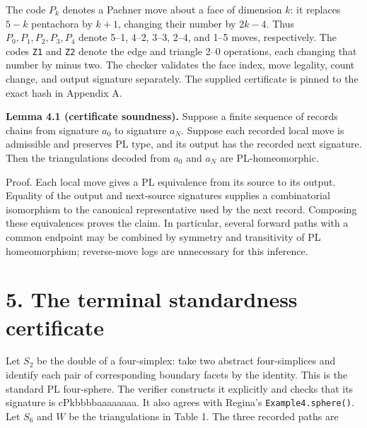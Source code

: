 \documentclass[11pt,letterpaper]{article}
\begin{document}
The code $P_k$ denotes a Pachner move about a face of dimension $k$: it replaces $5-k$ pentachora by $k+1$, changing their number by $2k-4$. Thus $P_0,P_1,P_2,P_3,P_4$ denote 5--1, 4--2, 3--3, 2--4, and 1--5 moves, respectively. The codes {\small\texttt{Z1}} and {\small\texttt{Z2}} denote the edge and triangle 2--0 operations, each changing that number by minus two. The checker validates the face index, move legality, count change, and output signature separately. The supplied certificate is pinned to the exact hash in Appendix A.

\medskip\noindent\textbf{Lemma 4.1 (certificate soundness).} Suppose a finite sequence of records chains from signature $a_0$ to signature $a_N$. Suppose each recorded local move is admissible and preserves PL type, and its output has the recorded next signature. Then the triangulations decoded from $a_0$ and $a_N$ are PL-homeomorphic.

Proof. Each local move gives a PL equivalence from its source to its output. Equality of the output and next-source signatures supplies a combinatorial isomorphism to the canonical representative used by the next record. Composing these equivalences proves the claim. In particular, several forward paths with a common endpoint may be combined by symmetry and transitivity of PL homeomorphism; reverse-move logs are unnecessary for this inference.

\section*{5. The terminal standardness certificate}
Let $S_2$ be the double of a four-simplex: take two abstract four-simplices and identify each pair of corresponding boundary facets by the identity. This is the standard PL four-sphere. The verifier constructs it explicitly and checks that its signature is \mbox{\small\ttfamily cPkbbbbaaaaaaaa}. It also agrees with Regina's {\small\texttt{Example4.sphere()}}. Let $S_6$ and $W$ be the triangulations in Table 1. The three recorded paths are
\end{document}
